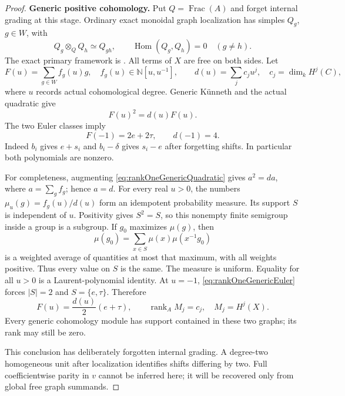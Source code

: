 \documentclass[11pt,a4paper]{article}
\renewcommand{\S}{\ensuremath{\mathsection}}
\theoremstyle{named}\newtheorem{finding}{Finding}[section]
\theoremstyle{definition}\newtheorem{definition}[finding]{Definition}
\theoremstyle{remark}\newtheorem{remark}[finding]{Remark}
\begin{document}
\begin{proof}
\par\smallskip\noindent\textbf{Generic positive cohomology.}\quad
Put \(Q=\operatorname{Frac}(A)\) and forget internal
grading at this stage. Ordinary exact monoidal graph
localization has simples \(Q_g\), \(g\in W\), with
\[
 Q_g\otimes_QQ_h\simeq Q_{gh},\qquad
 \operatorname{Hom}(Q_g,Q_h)=0\quad(g\ne h).
\]
The exact primary framework is
\cite[\S1.1, equations (1.1)--(1.2);
\S1.2, Theorem~1.6 and Remark~1.7]{EWLocalized}.
All terms of \(X\) are free on both sides.
Let
\[
 F(u)=\sum_{g\in W}f_g(u)g,\quad
 f_g(u)\in\mathbb N[u,u^{-1}],\qquad
 d(u)=\sum_j c_j u^j,\quad c_j=\dim_kH^j(C),
\]
where \(u\) records actual cohomological degree.
Generic K\"unneth and the actual quadratic give
\begin{equation}\label{eq:rankOneGenericQuadratic}
 F(u)^2=d(u)F(u).
\end{equation}
The two Euler classes imply
\begin{equation}\label{eq:rankOneGenericEuler}
 F(-1)=2e+2\tau,\qquad d(-1)=4.
\end{equation}
Indeed \(b_i\) gives \(e+s_i\) and
\(b_i-\delta\) gives \(s_i-e\) after forgetting shifts.
In particular both polynomials are nonzero.

For completeness, augmenting
\eqref{eq:rankOneGenericQuadratic} gives \(a^2=da\),
where \(a=\sum_gf_g\); hence \(a=d\).
For every real \(u>0\), the numbers
\(\mu_u(g)=f_g(u)/d(u)\) form an idempotent probability
measure. Its support \(S\) is independent of \(u\).
Positivity gives \(S^2=S\), so this nonempty finite
semigroup inside a group is a subgroup. If \(g_0\)
maximizes \(\mu(g)\), then
\[
 \mu(g_0)=\sum_{x\in S}\mu(x)\mu(x^{-1}g_0)
\]
is a weighted average of quantities at most that maximum,
with all weights positive. Thus every value on \(S\)
is the same. The measure is uniform.
Equality for all \(u>0\) is a Laurent-polynomial identity.
At \(u=-1\), \eqref{eq:rankOneGenericEuler} forces
\(|S|=2\) and \(S=\{e,\tau\}\). Therefore
\begin{equation}\label{eq:rankOneUniformGraphs}
 F(u)=\frac{d(u)}2(e+\tau),\qquad
 \operatorname{rank}_A M_j=c_j,\quad M_j=H^j(X).
\end{equation}
Every generic cohomology module has support contained
in these two graphs; its rank may still be zero.

This conclusion has deliberately forgotten internal
grading. A degree-two homogeneous unit after localization
identifies shifts differing by two. Full coefficientwise
parity in \(v\) cannot be inferred here; it will be
recovered only from global free graph summands.


\end{proof}
\end{document}
